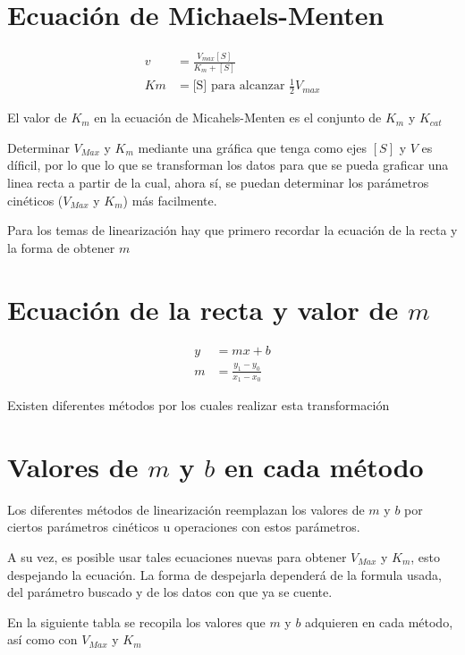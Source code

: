 \section{Ecuación de Michaels-Menten}

\begin{align*}
    v &= \frac{V_{max}[S]}{K_{m} + [S]}
    \\
    Km &= \text{[S] para alcanzar }\frac{1}{2}V_{max}
\end{align*}

El valor de $K_{m}$ en la ecuación de Micahels-Menten es el conjunto de $K_{m}$ y $K_{cat}$

Determinar $V_{Max}$ y $K_{m}$ mediante una gráfica que tenga como ejes $[S]$ y $V$ es díficil, por lo que lo que se transforman los datos para que se pueda graficar una linea recta a partir de la cual, ahora sí, se puedan determinar los parámetros cinéticos ($V_{Max}$ y $K_{m}$) más facilmente.

Para los temas de linearización hay que primero recordar la ecuación de la recta y la forma de obtener $m$

\section{Ecuación de la recta y valor de $m$}

\begin{align*}
    y &= mx+b
    \\
    m &= \frac{y_{1} - y_{0}}{x_{1} - x_{0}}
\end{align*}

Existen diferentes métodos por los cuales realizar esta transformación

\section{Valores de $m$ y $b$ en cada método}

Los diferentes métodos de linearización reemplazan los valores de $m$ y $b$ por ciertos parámetros cinéticos u operaciones con estos parámetros.

A su vez, es posible usar tales ecuaciones nuevas para obtener $V_{Max}$ y $K_{m}$, esto despejando la ecuación. La forma de despejarla dependerá de la formula usada, del parámetro buscado y de los datos con que ya se cuente.

En la siguiente tabla se recopila los valores que $m$ y $b$ adquieren en cada método, así como con $V_{Max}$ y $K_{m}$

